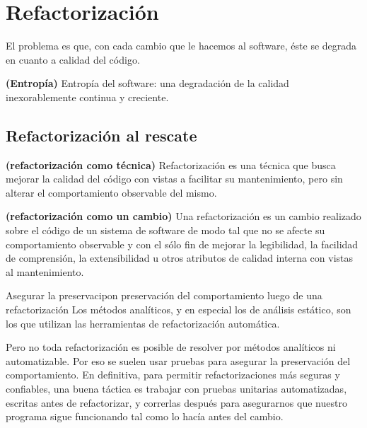 \documentclass[../main.tex]{subfiles}
\begin{document}
\section{Refactorización} 
    El problema es que, con cada cambio que le hacemos al software, éste se degrada en cuanto a calidad del código.

    \begin{definition} \textbf{(Entropía)}
        Entropía del software: una degradación de la calidad inexorablemente continua y creciente.
    \end{definition}

    \subsection{Refactorización al rescate}
        \begin{definition} \textbf{(refactorización como técnica)}
            Refactorización es una técnica que busca mejorar la calidad del código con vistas a facilitar su mantenimiento, pero sin alterar el comportamiento observable del mismo.
        \end{definition}

        \begin{definition} \textbf{(refactorización como un cambio)}
            Una refactorización es un cambio realizado sobre el código de un sistema de software de modo tal que no se afecte su comportamiento observable y con el sólo fin de mejorar la legibilidad, la facilidad de comprensión, la extensibilidad u otros atributos de calidad interna con vistas al mantenimiento.
        \end{definition}

        Asegurar la preservacipon preservación del comportamiento luego de una
        refactorización Los métodos analíticos, y en especial los de análisis estático, son los que utilizan las herramientas de refactorización
        automática.

        Pero no toda refactorización es posible de resolver por métodos analíticos ni automatizable. Por eso se suelen usar pruebas para asegurar la preservación del comportamiento. En definitiva, para permitir refactorizaciones más seguras y confiables, una buena táctica es trabajar con pruebas unitarias automatizadas, escritas antes de refactorizar, y correrlas después para asegurarnos que nuestro programa sigue funcionando tal como lo hacía antes del cambio.
\end{document}
